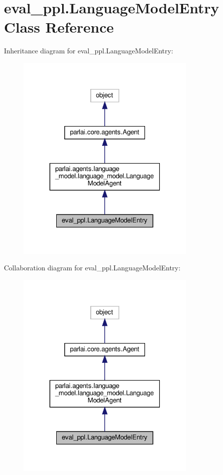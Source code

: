 \hypertarget{classeval__ppl_1_1LanguageModelEntry}{}\section{eval\+\_\+ppl.\+Language\+Model\+Entry Class Reference}
\label{classeval__ppl_1_1LanguageModelEntry}


Inheritance diagram for eval\+\_\+ppl.\+Language\+Model\+Entry\+:
\nopagebreak
\begin{figure}[H]
\begin{center}
\leavevmode
\includegraphics[width=247pt]{classeval__ppl_1_1LanguageModelEntry__inherit__graph}
\end{center}
\end{figure}


Collaboration diagram for eval\+\_\+ppl.\+Language\+Model\+Entry\+:
\nopagebreak
\begin{figure}[H]
\begin{center}
\leavevmode
\includegraphics[width=247pt]{classeval__ppl_1_1LanguageModelEntry__coll__graph}
\end{center}
\end{figure}
